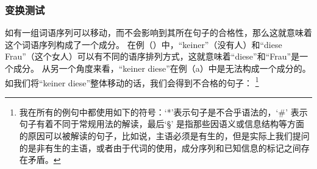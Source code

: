 \subsubsection{变换测试}
如有一组词语序列可以移动，而不会影响到其所在句子的合格性，那么这就意味着这个词语序列构成了一个成分。
在例（）中，“keiner”（没有人）和“diese Frau”（这个女人）可以有不同的语序排列方式，这就意味着“diese”和“Frau”是一个成分。
\eal
{}
\zl
从另一个角度来看，“keiner diese”在例（a）中是无法构成一个成分的。如我们将“keiner diese”整体移动的话，我们会得到不合格的句子：
\footnote{我在所有的例句中都使用如下的符号：`*'\is{*}表示句子是不合乎语法的，`\#'\is{\#} 表示句子有着不同于常规用法的解读，最后`\S'\is{\S} 是指那些因语义或信息结构等方面的原因可以被解读的句子，比如说，主语必须是有生的，但是实际上我们提问的是非有生的主语，或者由于代词的使用，成分序列和已知信息的标记之间存在矛盾。 }
 \eal
{}
\zl

